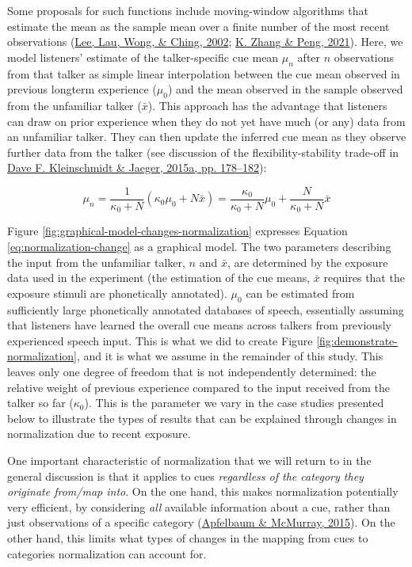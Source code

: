 \documentclass[
  11pt,
  english,
  man,floatsintext]{apa6}
\begin{document}
Some proposals for such functions include moving-window algorithms that estimate the mean as the sample mean over a finite number of the most recent observations (\protect\hyperlink{ref-lee2002}{Lee, Lau, Wong, \& Ching, 2002}; \protect\hyperlink{ref-zhang-peng2021}{K. Zhang \& Peng, 2021}). Here, we model listeners' estimate of the talker-specific cue mean \(\mu_n\) after \(n\) observations from that talker as simple linear interpolation between the cue mean observed in previous longterm experience (\(\mu_0\)) and the mean observed in the sample observed from the unfamiliar talker (\(\bar{x}\)). This approach has the advantage that listeners can draw on prior experience when they do not yet have much (or any) data from an unfamiliar talker. They can then update the inferred cue mean as they observe further data from the talker (see discussion of the flexibility-stability trade-off in \protect\hyperlink{ref-kleinschmidt-jaeger2015}{Dave F. Kleinschmidt \& Jaeger, 2015a, pp. 178--182}):

\begin{equation}\label{eq:normalization-change}
\mu_n = \frac{1}{\kappa_0 + N} \left( \kappa_0 \mu_0 + N \bar{x} \right) = \frac{\kappa_0}{\kappa_0 + N} \mu_0 + \frac{N}{\kappa_0 + N}\bar{x} 
\end{equation}

Figure \ref{fig:graphical-model-changes-normalization} expresses Equation \eqref{eq:normalization-change} as a graphical model. The two parameters describing the input from the unfamiliar talker, \(n\) and \(\bar{x}\), are determined by the exposure data used in the experiment (the estimation of the cue means, \(\bar{x}\) requires that the exposure stimuli are phonetically annotated). \(\mu_0\) can be estimated from sufficiently large phonetically annotated databases of speech, essentially assuming that listeners have learned the overall cue means across talkers from previously experienced speech input. This is what we did to create Figure \ref{fig:demonstrate-normalization}, and it is what we assume in the remainder of this study. This leaves only one degree of freedom that is not independently determined: the relative weight of previous experience compared to the input received from the talker so far (\(\kappa_0\)). This is the parameter we vary in the case studies presented below to illustrate the types of results that can be explained through changes in normalization due to recent exposure.

One important characteristic of normalization that we will return to in the general discussion is that it applies to cues \emph{regardless of the category they originate from/map into}. On the one hand, this makes normalization potentially very efficient, by considering \emph{all} available information about a cue, rather than just observations of a specific category (\protect\hyperlink{ref-apfelbaum-mcmurray2015}{Apfelbaum \& McMurray, 2015}). On the other hand, this limits what types of changes in the mapping from cues to categories normalization can account for.
\end{document}
